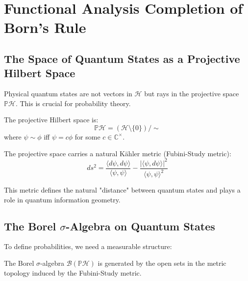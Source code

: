 \section{Functional Analysis Completion of Born's Rule}
\label{app:born_functional_analysis}

\subsection{The Space of Quantum States as a Projective Hilbert Space}

Physical quantum states are not vectors in $\mathcal{H}$ but rays in the projective space $\mathbb{P}\mathcal{H}$. This is crucial for probability theory.

\begin{definition}
The projective Hilbert space is:
\begin{equation}
    \mathbb{P}\mathcal{H} = (\mathcal{H} \setminus \{0\}) / \sim
\end{equation}
where $\psi \sim \phi$ iff $\psi = c\phi$ for some $c \in \mathbb{C}^\times$.
\end{definition}

\begin{theorem}
The projective space carries a natural Kähler metric (Fubini-Study metric):
\begin{equation}
    ds^2 = \frac{\langle d\psi, d\psi \rangle}{\langle \psi, \psi \rangle} - \frac{|\langle \psi, d\psi \rangle|^2}{\langle \psi, \psi \rangle^2}
\end{equation}
\end{theorem}

This metric defines the natural "distance" between quantum states and plays a role in quantum information geometry.

\subsection{The Borel $\sigma$-Algebra on Quantum States}

To define probabilities, we need a measurable structure:

\begin{definition}
The Borel $\sigma$-algebra $\mathcal{B}(\mathbb{P}\mathcal{H})$ is generated by the open sets in the metric topology induced by the Fubini-Study metric.
\end{definition}

